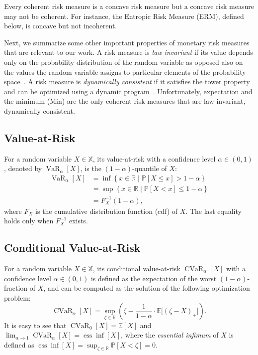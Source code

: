 \documentclass[twoside]{article}
\newcommand{\E}{\mathbb{E}}
\renewcommand{\P}[1]{\mathbb{P}\left[ #1 \right]}
\newcommand{\var}[2]{\operatorname{VaR}_{#1} \left[#2\right]}
\newcommand{\cvar}[2]{\operatorname{CVaR}_{#1} \left[#2\right]}
\newcommand{\Real}{\mathbb{R}}
\theoremstyle{plain}
\theoremstyle{definition}
\theoremstyle{remark}
\renewcommand{\cite}[1]{\citep{#1}}
\begin{document}
Every coherent risk measure is a concave risk measure but a concave risk measure may not be coherent. For instance, the Entropic Risk Measure (ERM), defined below, is concave but not incoherent. 

Next, we summarize some other important properties of monetary risk measures that are relevant to our work. A risk measure is \emph{law invariant} if its value depends only on the probability distribution of the random variable as opposed also on the values the random variable assigns to particular elements of the probability space~\cite{Shapiro2014}. A risk measure is  \emph{dynamically consistent} if it satisfies the tower property~\cite{Shapiro2014} and can be optimized using a dynamic program~\cite{Cvitanic1999,Pflug2005,Riedel2004,Delbaen2006,Frittelli2004,Artzner2004,Dowson2021}. Unfortunately, expectation and the minimum (Min) are the only coherent risk measures that are law invariant, dynamically consistent. 


\subsection{Value-at-Risk}
\label{ent:subsec:VaR}

For a random variable $X\in\mathbb X$, its value-at-risk with a confidence level $\alpha\in (0,1)$, denoted by $\var{\alpha}{X}$, is the $(1-\alpha)$-quantile of $X$:
%
\begin{align*}
  \var{\alpha}{X} &= \inf\left\{ x\in \Real \mid \P{X \le x} > 1 - \alpha\right\} \\
                  &= \sup \left\{ x \in \Real \mid \P{X < x} \le 1 - \alpha \right\} \\
    &= F^{-1}_X(1-\alpha),
\end{align*}
%
where $F_X$ is the cumulative distribution function (cdf) of $X$. The last equality holds only when $F_X^{-1}$ exists. 


\subsection{Conditional Value-at-Risk}
\label{ent:subsec:CVaR}

For a random variable $X\in\mathbb X$, its conditional value-at-risk $\cvar{\alpha}{X}$ with a confidence level $\alpha \in (0,1)$ is defined as the expectation of the worst $(1-\alpha)$-fraction of $X$, and can be computed as the solution of the following optimization problem:
%
\begin{equation*}
\cvar{\alpha}{X} = \sup_{\zeta\in\mathbb R}\left(\zeta - \frac{1}{1 - \alpha}\cdot\mathbb E\big[(\zeta - X)_+\big]\right).
\end{equation*}
%
It is easy to see that $\cvar{0}{X} = \E[X]$ and $\lim_{\alpha\rightarrow 1}\cvar{\alpha}{X} = \operatorname{ess} \inf[X]$, where the \emph{essential infimum} of $X$ is defined as $\operatorname{ess} \inf[X] = \sup_{\zeta\in \Real} \P{X < \zeta} = 0 $.
\end{document}
